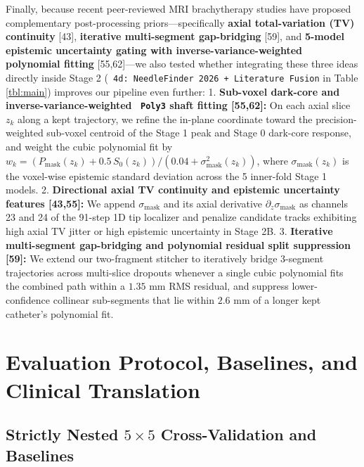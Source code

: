 \documentclass[
  11pt,
]{article}
\let\nforigtexttt\texttt
\renewcommand{\texttt}[1]{\nforigtexttt{\XeTeXinterchartokenstate=1 #1}}
\begin{document}
Finally, because recent peer-reviewed MRI brachytherapy studies have
proposed complementary post-processing priors---specifically
\textbf{axial total-variation (TV) continuity} {[}43{]},
\textbf{iterative multi-segment gap-bridging} {[}59{]}, and
\textbf{5-model epistemic uncertainty gating with
inverse-variance-weighted polynomial fitting} {[}55,62{]}---we also
tested whether integrating these three ideas directly inside Stage 2
(\texttt{4d:\ NeedleFinder\ 2026\ +\ Literature\ Fusion} in Table
\ref{tbl:main}) improves our pipeline even further: 1. \textbf{Sub-voxel
dark-core and inverse-variance-weighted \texttt{Poly3} shaft fitting
{[}55,62{]}:} On each axial slice \(z_k\) along a kept trajectory, we
refine the in-plane coordinate toward the precision-weighted sub-voxel
centroid of the Stage 1 peak and Stage 0 dark-core response, and weight
the cubic polynomial fit by
\(w_k = (P_{\text{mask}}(z_k) + 0.5\,S_0(z_k)) / (0.04 + \sigma_{\text{mask}}^2(z_k))\),
where \(\sigma_{\text{mask}}(z_k)\) is the voxel-wise epistemic standard
deviation across the 5 inner-fold Stage 1 models. 2. \textbf{Directional
axial TV continuity and epistemic uncertainty features {[}43,55{]}:} We
append \(\sigma_{\text{mask}}\) and its axial derivative
\(\partial_z \sigma_{\text{mask}}\) as channels 23 and 24 of the 91-step
1D tip localizer and penalize candidate tracks exhibiting high axial TV
jitter or high epistemic uncertainty in Stage 2B. 3. \textbf{Iterative
multi-segment gap-bridging and polynomial residual split suppression
{[}59{]}:} We extend our two-fragment stitcher to iteratively bridge
3-segment trajectories across multi-slice dropouts whenever a single
cubic polynomial fits the combined path within a \(1.35\text{ mm}\) RMS
residual, and suppress lower-confidence collinear sub-segments that lie
within \(2.6\text{ mm}\) of a longer kept catheter's polynomial fit.

\FloatBarrier

\section{Evaluation Protocol, Baselines, and Clinical
Translation}\label{evaluation-protocol-baselines-and-clinical-translation}

\subsection{\texorpdfstring{Strictly Nested \(5 \times 5\)
Cross-Validation and
Baselines}{Strictly Nested 5 \textbackslash times 5 Cross-Validation and Baselines}}\label{strictly-nested-5-times-5-cross-validation-and-baselines}
\end{document}
